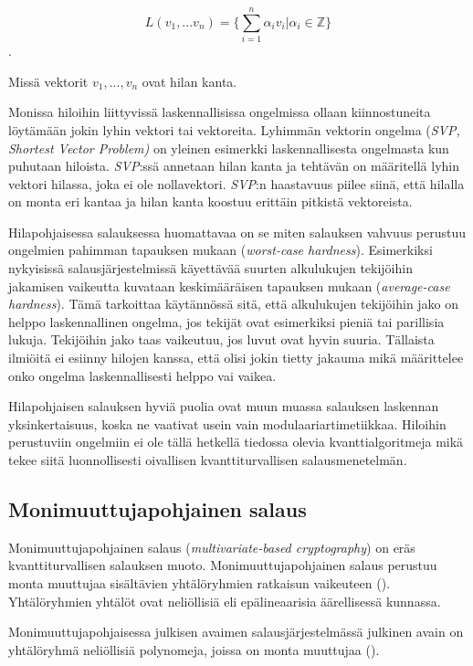 \[L(v_1,...v_n) =\Bigg\{ {\sum_{i=1}^{n}\alpha_i 
v_i|\alpha_i \in \mathbb{Z}} \Bigg\}\]. 

Missä vektorit $v_1,...,v_n$ ovat hilan kanta.

Monissa hiloihin liittyvissä 
laskennallisissa ongelmissa ollaan kiinnostuneita löytämään jokin lyhin vektori tai vektoreita. Lyhimmän vektorin ongelma (\emph{SVP, Shortest Vector Problem)} on yleinen esimerkki laskennallisesta ongelmasta kun puhutaan hiloista. \emph{SVP}:ssä annetaan hilan kanta ja tehtävän on määritellä lyhin vektori hilassa, joka ei ole nollavektori. \emph{SVP}:n haastavuus piilee siinä, että hilalla on monta eri kantaa ja hilan kanta koostuu erittäin pitkistä vektoreista.

Hilapohjaisessa salauksessa huomattavaa on se miten salauksen vahvuus perustuu ongelmien pahimman tapauksen mukaan (\emph{worst-case hardness}). Esimerkiksi nykyisissä salausjärjestelmissä käyettävää suurten alkulukujen tekijöihin jakamisen vaikeutta kuvataan keskimääräisen tapauksen mukaan (\emph{average-case hardness}). Tämä tarkoittaa käytännössä sitä, että alkulukujen tekijöihin jako on helppo laskennallinen ongelma, jos tekijät ovat esimerkiksi pieniä tai parillisia lukuja. Tekijöihin jako taas vaikeutuu, jos luvut ovat hyvin suuria. Tällaista ilmiöitä ei esiinny hilojen kanssa, että olisi jokin tietty jakauma mikä määrittelee onko ongelma laskennallisesti helppo vai vaikea.

Hilapohjaisen salauksen hyviä puolia ovat muun muassa salauksen laskennan yksinkertaisuus, koska ne vaativat usein vain modulaariartimetiikkaa. Hiloihin perustuviin ongelmiin ei ole tällä hetkellä tiedossa olevia kvanttialgoritmeja mikä tekee siitä luonnollisesti oivallisen kvanttiturvallisen salausmenetelmän.

\subsection{Monimuuttujapohjainen salaus}
Monimuuttujapohjainen salaus (\emph{multivariate-based cryptography}) on eräs kvanttiturvallisen salauksen muoto. Monimuuttujapohjainen salaus perustuu monta muuttujaa sisältävien yhtälöryhmien ratkaisun vaikeuteen (\cite{Ding2009}). Yhtälöryhmien yhtälöt ovat neliöllisiä eli epälineaarisia äärellisessä kunnassa.

Monimuuttujapohjaisessa julkisen avaimen salausjärjestelmässä julkinen avain on yhtälöryhmä neliöllisiä polynomeja, joissa on monta muuttujaa (\cite{8012305}).

